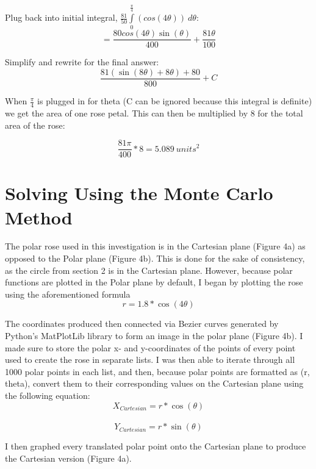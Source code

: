 \documentclass[11pt]{article}
\begin{document}
Plug back into initial integral, $\frac{81}{50}\int\limits_{0}^{\frac{\pi}{4}} (cos(4\theta)) \ d\theta $:
\[=\frac{80cos(4\theta)\sin(\theta)}{400} + \frac{81\theta}{100}\]

Simplify and rewrite for the final answer:
\[\frac{81(\sin(8\theta)+8 \theta) + 80}{800} + C\]

\newpage
When $\frac{\pi}{4}$ is plugged in for theta (C can be ignored because this integral is definite) we get the area of one rose petal. This can then be multiplied by 8 for the total area of the rose:

\[\frac{81 \pi}{400} * 8 = \boxed{5.089 \ units^2}\]

\section{Solving Using the Monte Carlo Method}

The polar rose used in this investigation is in the Cartesian plane (Figure 4a) as opposed to the Polar plane (Figure 4b). This is done for the sake of consistency, as the circle from section 2 is in the Cartesian plane. However, because polar functions are plotted in the Polar plane by default, I began by plotting the rose using the aforementioned formula\\[-3ex]

\[r=1.8*\cos(4\theta)\]

The coordinates produced then connected via Bezier curves generated by Python’s MatPlotLib library to form an image in the polar plane (Figure 4b). I made sure to store the polar x- and y-coordinates of the points of every point used to create the rose in separate lists. I was then able to iterate through all 1000 polar points in each list, and then, because polar points are formatted as (r, theta), convert them to their corresponding values on the Cartesian plane using the following equation:\\[-3ex]

\[X_{Cartesian}=r*\cos(\theta)\]\\[-7ex]
\[Y_{Cartesian}=r*\sin(\theta)\]


I then graphed every translated polar point onto the Cartesian plane to produce the Cartesian version (Figure 4a). 
\end{document}
